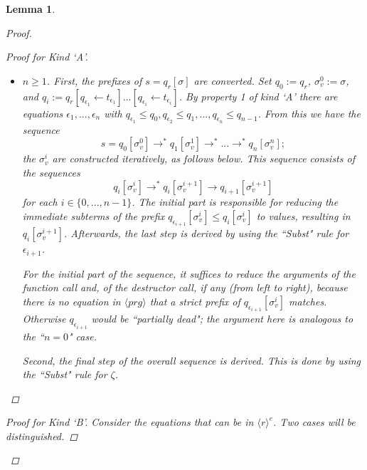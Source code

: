 \documentclass[11pt]{article} %
\newtheorem{lemma}{Lemma}
\begin{document}
\begin{lemma}
\begin{proof}
\begin{enumerate}
\begin{proof}[Proof for Kind `A']
\begin{itemize}
\item $n \geq 1$. First, the prefixes of $s = q_r[\sigma]$ are converted. Set $q_0 := q_r$, $\sigma^0_v := \sigma$, and $q_i := q_r[q_{\epsilon_1} \leftarrow t_{\epsilon_1}]...[q_{\epsilon_i} \leftarrow t_{\epsilon_i}]$. By property 1 of kind `A' there are equations $\epsilon_1, ..., \epsilon_n$ with $q_{\epsilon_1} \leq q_0, q_{\epsilon_2} \leq q_1, ..., q_{\epsilon_n} \leq q_{n-1}$. From this we have the sequence
\begin{equation*}
s = q_0[\sigma^0_v] \longrightarrow^* q_1[\sigma^1_v] \longrightarrow^* ... \longrightarrow^* q_n[\sigma^n_v];
\end{equation*}
the $\sigma^i_v$ are constructed iteratively, as follows below. This sequence consists of the sequences
\begin{equation*}
q_i[\sigma^i_v] \longrightarrow^* q_i[\sigma^{i+1}_v] \longrightarrow q_{i+1}[\sigma^{i+1}_v]
\end{equation*}
for each $i \in \{0, ..., n-1\}$. The initial part is responsible for reducing the immediate subterms of the prefix $q_{\epsilon_{i+1}}[\sigma^i_v] \leq q_i[\sigma^i_v]$ to values, resulting in $q_i[\sigma^{i+1}_v]$. Afterwards, the last step is derived by using the ``Subst" rule for $\epsilon_{i+1}$.

For the initial part of the sequence, it suffices to reduce the arguments of the function call and, of the destructor call, if any (from left to right), because there is no equation in $\langle prg \rangle$ that a strict prefix of $q_{\epsilon_{i+1}}[\sigma^i_v]$ matches. Otherwise $q_{\epsilon_{i+1}}$ would be ``partially dead"; the argument here is analogous to the ``$n = 0$" case.

Second, the final step of the overall sequence is derived. This is done by using the ``Subst" rule for $\zeta$.

\end{itemize}

\end{proof}

\begin{proof}[Proof for Kind `B'] Consider the equations that can be in $\langle r \rangle^e$. Two cases will be distinguished.


\end{proof}
\end{enumerate}
\end{proof}
\end{lemma}
\end{document}
